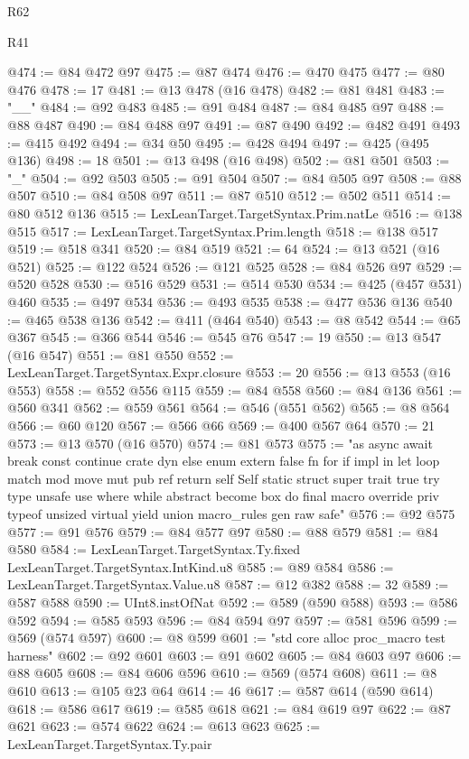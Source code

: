 \begin{lexlean}{R62}
\begin{lexlean}{R41}
\begin{coremodule}
{{{{{{{{{{{{{{{{{{{{{{{{{{{{{{{{{{{{{{{{{{{{{{{{{{{{{{{{{{{{{{{{{{{{{{{{{{{{{{{{{{{{{{{@474 := @84 @472 @97
@475 := @87 @474
@476 := @470 @475
@477 := @80 @476
@478 := 17
@481 := @13 @478 (@16 @478)
@482 := @81 @481
@483 := "__"
@484 := @92 @483
@485 := @91 @484
@487 := @84 @485 @97
@488 := @88 @487
@490 := @84 @488 @97
@491 := @87 @490
@492 := @482 @491
@493 := @415 @492
@494 := @34 @50
@495 := @428 @494
@497 := @425 (@495 @136)
@498 := 18
@501 := @13 @498 (@16 @498)
@502 := @81 @501
@503 := "_"
@504 := @92 @503
@505 := @91 @504
@507 := @84 @505 @97
@508 := @88 @507
@510 := @84 @508 @97
@511 := @87 @510
@512 := @502 @511
@514 := @80 @512 @136
@515 := LexLeanTarget.TargetSyntax.Prim.natLe
@516 := @138 @515
@517 := LexLeanTarget.TargetSyntax.Prim.length
@518 := @138 @517
@519 := @518 @341
@520 := @84 @519
@521 := 64
@524 := @13 @521 (@16 @521)
@525 := @122 @524
@526 := @121 @525
@528 := @84 @526 @97
@529 := @520 @528
@530 := @516 @529
@531 := @514 @530
@534 := @425 (@457 @531) @460
@535 := @497 @534
@536 := @493 @535
@538 := @477 @536 @136
@540 := @465 @538 @136
@542 := @411 (@464 @540)
@543 := @8 @542
@544 := @65 @367
@545 := @366 @544
@546 := @545 @76
@547 := 19
@550 := @13 @547 (@16 @547)
@551 := @81 @550
@552 := LexLeanTarget.TargetSyntax.Expr.closure
@553 := 20
@556 := @13 @553 (@16 @553)
@558 := @552 @556 @115
@559 := @84 @558
@560 := @84 @136
@561 := @560 @341
@562 := @559 @561
@564 := @546 (@551 @562)
@565 := @8 @564
@566 := @60 @120
@567 := @566 @66
@569 := @400 @567 @64
@570 := 21
@573 := @13 @570 (@16 @570)
@574 := @81 @573
@575 := "as async await break const continue crate dyn else enum extern false fn for if impl in let loop match mod move mut pub ref return self Self static struct super trait true try type unsafe use where while abstract become box do final macro override priv typeof unsized virtual yield union macro_rules gen raw safe"
@576 := @92 @575
@577 := @91 @576
@579 := @84 @577 @97
@580 := @88 @579
@581 := @84 @580
@584 := LexLeanTarget.TargetSyntax.Ty.fixed LexLeanTarget.TargetSyntax.IntKind.u8
@585 := @89 @584
@586 := LexLeanTarget.TargetSyntax.Value.u8
@587 := @12 @382
@588 := 32
@589 := @587 @588
@590 := UInt8.instOfNat
@592 := @589 (@590 @588)
@593 := @586 @592
@594 := @585 @593
@596 := @84 @594 @97
@597 := @581 @596
@599 := @569 (@574 @597)
@600 := @8 @599
@601 := "std core alloc proc_macro test harness"
@602 := @92 @601
@603 := @91 @602
@605 := @84 @603 @97
@606 := @88 @605
@608 := @84 @606 @596
@610 := @569 (@574 @608)
@611 := @8 @610
@613 := @105 @23 @64
@614 := 46
@617 := @587 @614 (@590 @614)
@618 := @586 @617
@619 := @585 @618
@621 := @84 @619 @97
@622 := @87 @621
@623 := @574 @622
@624 := @613 @623
@625 := LexLeanTarget.TargetSyntax.Ty.pair
}}}}}}}}}}}}}}}}}}}}}}}}}}}}}}}}}}}}}}}}}}}}}}}}}}}}}}}}}}}}}}}}}}}}}}}}}}}}}}}}}}}}}}}
\end{coremodule}
\end{lexlean}
\end{lexlean}
